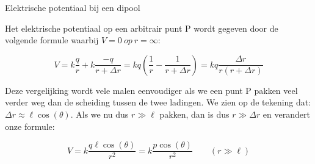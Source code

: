 \begin{app}{Elektrische potentiaal bij een dipool}
    \vspace{-0.2cm}
    \begin{minipage}{.68 \textwidth}
        \vspace{-0.4cm}
        Het elektrische potentiaal op een arbitrair punt P wordt gegeven door de volgende formule waarbij $ V = 0 \ op \ r = \infty $:
        
        \begin{equation*}
            V = k\dfrac{q}{r} + k \dfrac{-q}{r + \Delta r} = kq\left(\dfrac{1}{r} - \dfrac{1}{r+ \Delta r}\right) = kq\dfrac{\Delta r}{r(r+\Delta r)}
        \end{equation*}
        
        \noindent Deze vergelijking wordt vele malen eenvoudiger als we een punt P pakken veel verder weg dan de scheiding tussen de twee ladingen. We zien op de tekening dat: $ \Delta r \approx \ell\cos(\theta) $. Als we nu dus $ r \gg \ell $ pakken, dan is dus $ r \gg \Delta r $ en verandert onze formule:
        
        \begin{equation*}
            V = k\dfrac{q\ell\cos(\theta)}{r^2} = k\dfrac{p\cos(\theta)}{r^2} \quad \quad (r \gg \ell)
        \end{equation*}
        
        
    

\end{minipage}
\end{app}
